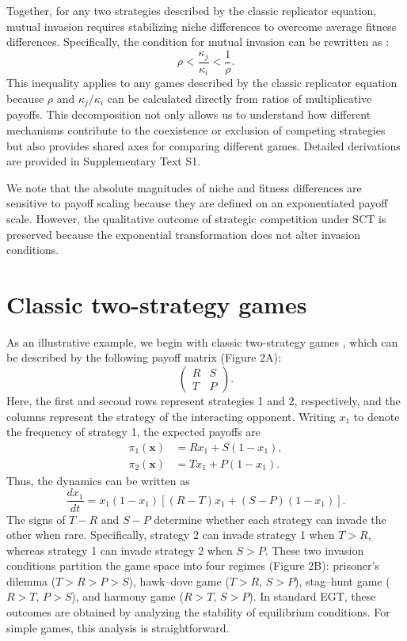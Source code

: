 \documentclass[12pt]{article}
\begin{document}
Together, for any two strategies described by the classic replicator equation, mutual invasion requires stabilizing niche differences to overcome average fitness differences.
Specifically, the condition for mutual invasion can be rewritten as \citep{chesson2000mechanisms}:
\begin{equation}
\rho < \frac{\kappa_j}{\kappa_i} < \frac{1}{\rho}.
\end{equation}
This inequality applies to any games described by the classic replicator equation because $\rho$ and $\kappa_j/\kappa_i$ can be calculated directly from ratios of multiplicative payoffs.
This decomposition not only allows us to understand how different mechanisms contribute to the coexistence or exclusion of competing strategies but also provides shared axes for comparing different games.
Detailed derivations are provided in Supplementary Text S1.

We note that the absolute magnitudes of niche and fitness differences are sensitive to payoff scaling because they are defined on an exponentiated payoff scale.
However, the qualitative outcome of strategic competition under SCT is preserved because the exponential transformation does not alter invasion conditions.

\section*{Classic two-strategy games}

As an illustrative example, we begin with classic two-strategy games \citep{hauert2002effects,szabo2007evolutionary,cooney2020analysis,tarnita2025reconciling}, which can be described by the following payoff matrix (Figure 2A):
\begin{equation}
\begin{pmatrix}
R & S \\
T & P
\end{pmatrix}.
\end{equation}
Here, the first and second rows represent strategies 1 and 2, respectively, and the columns represent the strategy of the interacting opponent. 
Writing $x_1$ to denote the frequency of strategy 1, the expected payoffs are
\begin{align}
\pi_1(\mathbf{x}) &= R x_1 + S(1-x_1),\\
\pi_2(\mathbf{x}) &= T x_1 + P(1-x_1).
\end{align}
Thus, the dynamics can be written as
\begin{equation}
\frac{dx_1}{dt} = x_1(1-x_1)\left[(R-T)x_1 + (S-P)(1-x_1)\right].
\end{equation}
The signs of $T-R$ and $S-P$ determine whether each strategy can invade the other when rare.
Specifically, strategy 2 can invade strategy 1 when $T>R$, whereas strategy 1 can invade strategy 2 when $S>P$. 
These two invasion conditions partition the game space into four regimes (Figure 2B): 
prisoner’s dilemma ($T>R > P>S$), hawk--dove game ($T>R$, $S>P$), stag--hunt game ($R>T$, $P>S$), and harmony game ($R>T$, $S>P$).
In standard EGT, these outcomes are obtained by analyzing the stability of equilibrium conditions. 
For simple games, this analysis is straightforward.
\end{document}
